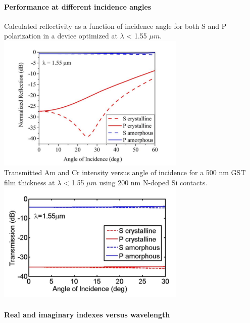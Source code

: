\documentclass[]{article}
\let\oldparagraph\paragraph
\renewcommand{\paragraph}[1]{\oldparagraph{#1}\mbox{}}
\begin{document}
\paragraph{Performance at different incidence
angles}\label{performance-at-different-incidence-angles}

Calculated reflectivity as a function of incidence angle for both S and
P polarization in a device optimized at $\lambda$ < 1.55 $\mu m$.\\
\includegraphics[width = 9cm]{image/002_05.png}\\
Transmitted Am and Cr intensity versus angle of incidence for a 500 nm
GST film thickness at $\lambda$ < 1.55 $\mu m$ using 200 nm N-doped Si contacts.\\
\includegraphics[width = 9cm]{image/002_09.png}

\newpage
\paragraph{Real and imaginary indexes versus
wavelength}\label{real-and-imaginary-indexes-versus-wavelength}
\end{document}
